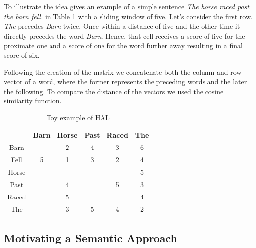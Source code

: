  To illustrate the idea \cite{burgess98} gives an example of a simple sentence \emph {The horse raced past the barn fell.} in Table \ref{tab:halex} with a sliding window of five. Let's consider the first row.  \emph{The} precedes \emph{Barn} twice. Once within a distance of five and the other time it directly precedes the word  \emph{Barn}. Hence, that cell receives a score of five for the proximate one and a score of one for the word further away resulting in a final score of six. 

Following the creation of the matrix we concatenate both the column and row vector of a word, where the former represents the preceding words and the later the following. To compare the distance of the vectors we used the cosine similarity function. 


\begin{table}[H]
\centering
\begin{tabular}{ c c c c c c} \toprule
  & Barn & Horse &  Past & Raced & The \\ 
  \hline
 Barn &  & 2 &  4 & 3 & 6 \\ 
 Fell & 5 & 1 &  3 & 2 & 4 \\ 
 Horse &  &  &   &  & 5 \\ 
 Past &  & 4 &   & 5 & 3 \\ 
 Raced &  & 5 &   &  & 4 \\ 
 The &  & 3 &  5 & 4 & 2 \\ 
   \bottomrule
\end{tabular}
\caption{Toy example of HAL}
\label{tab:halex}
\end{table}





\subsection{Motivating a Semantic Approach}
\label{subsec:hal}

